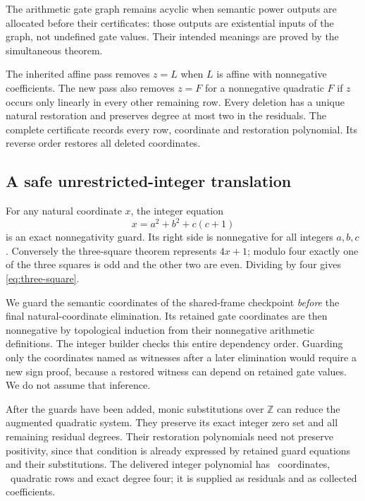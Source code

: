 \documentclass[11pt,letterpaper]{article}
\newcommand{\Z}{\mathbb Z}
\begin{document}
The arithmetic gate graph remains acyclic when semantic
power outputs are allocated before their certificates:
those outputs are existential inputs of the graph,
not undefined gate values. Their intended meanings are
proved by the simultaneous theorem.

The inherited affine pass removes $z=L$ when $L$ is
affine with nonnegative coefficients. The new pass
also removes $z=F$ for a nonnegative quadratic $F$ if
$z$ occurs only linearly in every other remaining row.
Every deletion has a unique natural restoration and
preserves degree at most two in the residuals.
The complete certificate records every row, coordinate
and restoration polynomial. Its reverse order restores
all deleted coordinates.

\subsection{A safe unrestricted-integer translation}
\label{sec:integer}

For any natural coordinate $x$, the integer equation
\begin{equation}
 x=a^2+b^2+c(c+1)
\label{eq:three-square}
\end{equation}
is an exact nonnegativity guard. Its right side is
nonnegative for all integers $a,b,c$.
Conversely the three-square theorem represents $4x+1$;
modulo four exactly one of the three squares is odd
and the other two are even. Dividing by four gives
\eqref{eq:three-square}.

We guard the semantic coordinates of the shared-frame
checkpoint \emph{before} the final natural-coordinate
elimination. Its retained gate coordinates are then
nonnegative by topological induction from their
nonnegative arithmetic definitions. The integer
builder checks this entire dependency order.
Guarding only the coordinates named as witnesses after
a later elimination would require a new sign proof,
because a restored witness can depend on retained
gate values. We do not assume that inference.

After the guards have been added, monic substitutions
over $\Z$ can reduce the augmented quadratic system.
They preserve its exact integer zero set and all
remaining residual degrees. Their restoration
polynomials need not preserve positivity, since that
condition is already expressed by retained guard
equations and their substitutions.
The delivered integer polynomial has \IntVars\
coordinates, \IntRows\ quadratic rows and exact
degree four; it is supplied as residuals and as
collected coefficients.
\end{document}
